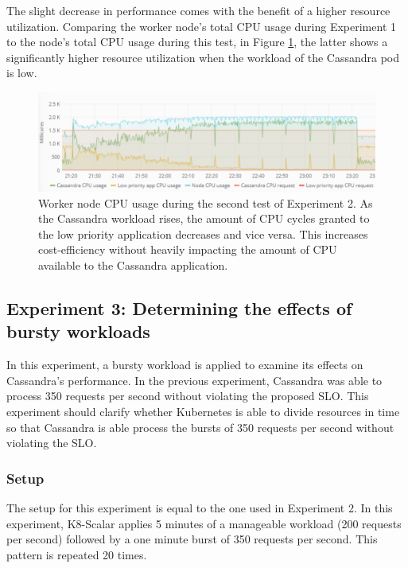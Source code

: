 The slight decrease in performance comes with the benefit of a higher resource utilization. Comparing the worker node's total CPU usage during Experiment 1 to the node's total CPU usage during this test, in Figure \ref{fig:cpu-cas-lpp-li-2}, the latter shows a significantly higher resource utilization when the workload of the Cassandra pod is low.

\begin{figure}[h]
\centering
\includegraphics[width=\textwidth]{Images/Experiments/CPU/Grafana/cpu-cas-lpp-li-2.PNG}
\caption{Worker node CPU usage during the second test of Experiment 2. As the Cassandra workload rises, the amount of CPU cycles granted to the low priority application decreases and vice versa. This increases cost-efficiency without heavily impacting the amount of CPU available to the Cassandra application.}
\label{fig:cpu-cas-lpp-li-2}
\end{figure}

\subsection{Experiment 3: Determining the effects of bursty workloads}
In this experiment, a bursty workload is applied to examine its effects on Cassandra's performance. In the previous experiment, Cassandra was able to process 350 requests per second without violating the proposed SLO. This experiment should clarify whether Kubernetes is able to divide resources in time so that Cassandra is able process the bursts of 350 requests per second without violating the SLO.

\subsubsection{Setup}
The setup for this experiment is equal to the one used in Experiment 2. In this experiment, K8-Scalar applies 5 minutes of a manageable workload (200 requests per second) followed by a one minute burst of 350 requests per second. This pattern is repeated 20 times.  


